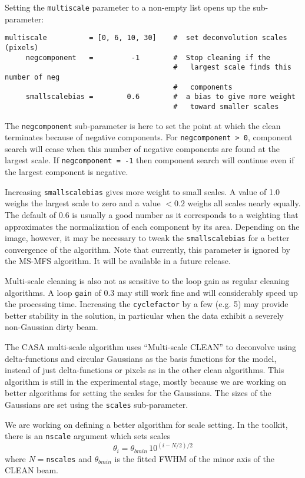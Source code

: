 Setting the {\tt multiscale} parameter to a non-empty list opens up the sub-parameter:
\small
\begin{verbatim}
multiscale          = [0, 6, 10, 30]    #  set deconvolution scales (pixels)
     negcomponent   =         -1        #  Stop cleaning if the
                                        #   largest scale finds this number of neg
                                        #   components
     smallscalebias =        0.6        #  a bias to give more weight
                                        #   toward smaller scales
\end{verbatim}
\normalsize
The {\tt negcomponent} sub-parameter is here to set
the point at which the clean terminates because of negative
components.  For {\tt negcomponent > 0}, component search will cease
when this number of negative components are found at the largest
scale.  If {\tt negcomponent = -1} then component search will continue
even if the largest component is negative.

Increasing {\tt smallscalebias} gives more weight to small scales.  A
value of 1.0 weighs the largest scale to zero and a value $<0.2$
weighs all scales nearly equally. The default of 0.6 is usually a good
number as it corresponds to a weighting that approximates the
normalization of each component by its area. Depending on the image,
however, it may be necessary to tweak the {\tt smallscalebias} for a
better convergence of the algorithm. Note that currently, this
parameter is ignored by the MS-MFS algorithm. It will be available in a
future release.

Multi-scale cleaning is also not as sensitive to the loop gain as
regular cleaning algorithms. A loop {\tt gain} of 0.3 may still work
fine and will considerably speed up the processing time. Increasing
the {\tt cyclefactor} by a few (e.g. 5) may provide better stability
in the solution, in particular when the data exhibit a severely
non-Gaussian dirty beam.


The CASA multi-scale algorithm uses ``Multi-scale CLEAN'' to
deconvolve using delta-functions and circular Gaussians as the basis
functions for the model, instead of just delta-functions or pixels as
in the other clean algorithms.  This algorithm is still in the
experimental stage, mostly because we are working on better algorithms
for setting the scales for the Gaussians.  The sizes of the Gaussians
are set using the {\tt scales} sub-parameter.  

We are working on defining a better algorithm for scale setting.  In
the toolkit, there is an {\tt nscale} argument which sets scales
\begin{equation}
  \theta_i = \theta_{bmin}\,10^{(i-N/2)/2}
\end{equation}
where $N=${\tt nscales} and $\theta_{bmin}$ is the fitted FWHM of the minor
axis of the CLEAN beam.

